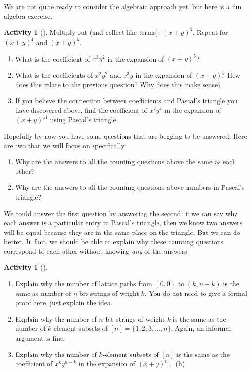 \documentclass[10pt,]{book}
\theoremstyle{plain}
\theoremstyle{definition}
\theoremstyle{definition}
\theoremstyle{definition}
\newtheorem{activity}[project]{Activity}
\numberwithin{equation}{chapter}
\begin{document}
\hypertarget{p-498}{}%
We are not quite ready to consider the algebraic approach yet, but here is a fun algebra exercise.%
\begin{activity}[]\label{activity-60}
\hypertarget{p-499}{}%
Multiply out (and collect like terms): \((x+y)^3\).  Repeat for \((x+y)^4\) and \((x+y)^5\).%
\begin{enumerate}[font=\bfseries,label=(\alph*),ref=\alph*]
\item\label{task-85} \hypertarget{p-500}{}%
What is the coefficient of \(x^3y^2\) in the expansion of \((x+y)^5\)?%
\item\label{task-86} \hypertarget{p-501}{}%
What is the coefficients of \(x^2y^2\) and \(x^3y\) in the expansion of \((x+y)\)?  How does this relate to the previous question?  Why does this make sense?%
\item\label{task-87} \hypertarget{p-502}{}%
If you believe the connection between coefficients and Pascal's triangle you have discovered above, find the coefficient of \(x^7y^4\) in the expansion of \((x+y)^{11}\) using Pascal's triangle.%
\end{enumerate}
\end{activity}
\hypertarget{p-503}{}%
Hopefully by now you have some questions that are begging to be answered.  Here are two that we will focus on specifically: \leavevmode%
\begin{enumerate}
\item\hypertarget{li-34}{}\hypertarget{p-504}{}%
Why are the answers to all the counting questions above the same as each other?%
\item\hypertarget{li-35}{}\hypertarget{p-505}{}%
Why are the answers to all the counting questions above numbers in Pascal's triangle?%
\end{enumerate}
%
\par
\hypertarget{p-506}{}%
We could answer the first question by answering the second: if we can say why each answer is a particular entry in Pascal's triangle, then we know two answers will be equal because they are in the same place on the triangle.  But we can do better.  In fact, we should be able to explain why these counting questions correspond to each other without knowing \emph{any} of the answers.%
\begin{activity}[]\label{activity-61}
\leavevmode%
\begin{enumerate}[font=\bfseries,label=(\alph*),ref=\alph*]
\item\label{task-88} \hypertarget{p-507}{}%
Explain why the number of lattice paths from \((0,0)\) to \((k,n-k)\) is the same as number of \(n\)-bit strings of weight \(k\). You do not need to give a formal proof here, just explain the idea.%
\item\label{task-89} \hypertarget{p-508}{}%
Explain why the number of \(n\)-bit strings of weight \(k\) is the same as the number of \(k\)-element subsets of \([n] = \{1,2,3,\ldots, n\}\).   Again, an informal argument is fine.%
\item\label{task-90} \hypertarget{p-509}{}%
Explain why the number of \(k\)-element subsets of \([n]\) is the same as the coefficient of \(x^ky^{n-k}\) in the expansion of \((x+y)^n\).%
~{\tiny (h)}\end{enumerate}
\end{activity}
\end{document}
